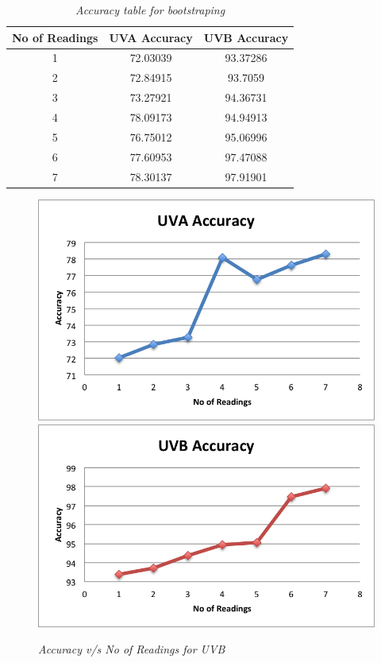 \documentclass[12pt,fullpage,doublespace]{article}
\begin{document}
\newpage
\begin{table}
\centering
\begin{tabular}{|c|c|c|}
\hline
No of Readings & UVA Accuracy & UVB Accuracy \\
\hline 
1 & 72.03039 & 93.37286\\
\hline
2 & 72.84915 & 93.7059 \\
\hline
3 & 73.27921	& 94.36731\\
\hline
4 & 78.09173	& 94.94913\\
\hline
5 & 76.75012 & 95.06996 \\
\hline
6 & 77.60953 & 97.47088 \\
\hline
7 & 78.30137 & 97.91901\\
\hline
\end{tabular}
\caption{\small \sl Accuracy table for bootstraping}\label{seg1accuracy}
\end{table}


\begin{figure}
\begin{center}
\includegraphics[scale=0.5]{uvaAccuracy.png}
\includegraphics[scale=0.55]{uvbAccuracy.png}
\caption{\small \sl Accuracy v/s No of Readings for UVB}
\label{fig:lessReadings}
\end{center}
\end{figure}
\end{document}
